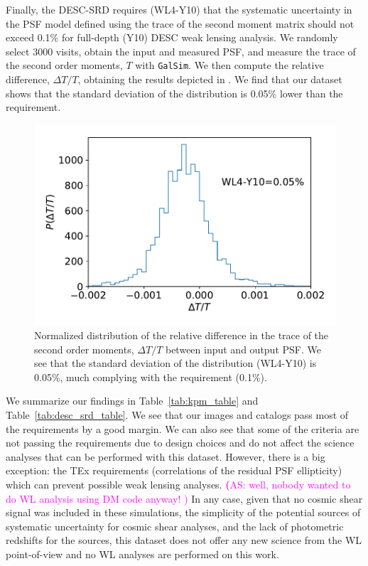 \documentclass[twocolumn]{aastex62}
\newcommand{\as}[1]{{\textcolor{magenta}{{\textbf (AS: #1)}}}}
\begin{document}
Finally, the DESC-SRD requires (WL4-Y10) that the systematic uncertainty in the PSF model defined using the trace of the second moment matrix should not exceed 0.1\% for full-depth (Y10) DESC weak lensing analysis. We randomly select 3000 visits, obtain the input and measured PSF, and measure the trace of the second order moments, $T$ with \texttt{GalSim}. We then compute the relative difference, $\Delta T/T$, obtaining the results depicted in . We find that our dataset shows that the standard deviation of the distribution is 0.05\% lower than the requirement.
\begin{figure}
\centering
\includegraphics[width=0.9\columnwidth]{WL4-Y10}
\caption{Normalized distribution of the relative difference in the trace of the second order moments, $\Delta T/T$ between input and output PSF. We see that the standard deviation of the distribution (WL4-Y10) is 0.05\%, much complying with the requirement (0.1\%).}
\label{fig:WL4-Y10}
\end{figure}

We summarize our findings in Table~\ref{tab:kpm_table} and Table~\ref{tab:desc_srd_table}. We see that our images and catalogs pass most of the requirements by a good margin. We can also see that some of the criteria are not passing the requirements due to design choices and do not affect the science analyses that can be performed with this dataset. However, there is a big exception: the TEx requirements (correlations of the residual PSF ellipticity) which can prevent possible weak lensing analyses. \as{well, nobody wanted to do WL analysis using DM code anyway! } In any case, given that no cosmic shear signal was included in these simulations, the simplicity of the potential sources of systematic uncertainty for cosmic shear analyses, and the lack of photometric redshifts for the sources, this dataset does not offer any new science from the WL point-of-view and no WL analyses are performed on this work. 
\end{document}
